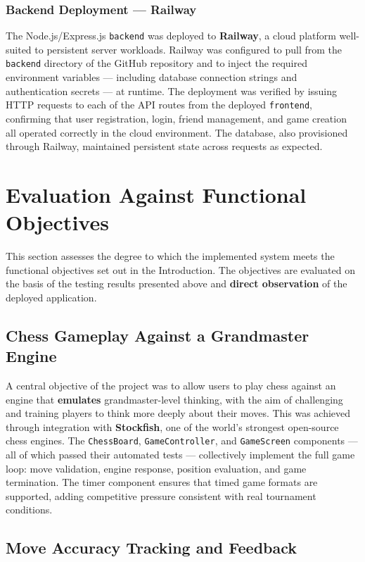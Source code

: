 \subsubsection*{Backend Deployment — Railway}

The Node.js/Express.js \texttt{backend} was deployed to \textbf{Railway}, a cloud platform well-suited to persistent server workloads. Railway was configured to pull from the \texttt{backend} directory of the GitHub repository and to inject the required environment variables — including database connection strings and authentication secrets — at runtime. The deployment was verified by issuing HTTP requests to each of the API routes from the deployed \texttt{frontend}, confirming that user registration, login, friend management, and game creation all operated correctly in the cloud environment. The database, also provisioned through Railway, maintained persistent state across requests as expected.

\section*{Evaluation Against Functional Objectives}

This section assesses the degree to which the implemented system meets the functional objectives set out in the Introduction. The objectives are evaluated on the basis of the testing results presented above and \textbf{direct observation} of the deployed application.

\subsection*{Chess Gameplay Against a Grandmaster Engine}

A central objective of the project was to allow users to play chess against an engine that \textbf{emulates} grandmaster-level thinking, with the aim of challenging and training players to think more deeply about their moves. This was achieved through integration with \textbf{Stockfish}, one of the world's strongest open-source chess engines. The \texttt{ChessBoard}, \texttt{GameController}, and \texttt{GameScreen} components — all of which passed their automated tests — collectively implement the full game loop: move validation, engine response, position evaluation, and game termination. The timer component ensures that timed game formats are supported, adding competitive pressure consistent with real tournament conditions.

\subsection*{Move Accuracy Tracking and Feedback}

